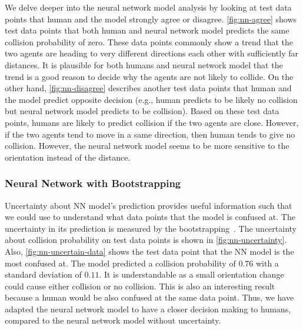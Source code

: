 We delve deeper into the neural network model analysis by looking at test data points that human and the model strongly agree or disagree.
\cref{fig:nn-agree} shows test data points that both human and neural network model predicts the same collision probability of zero. 
These data points commonly show a trend that the two agents are heading to very different directions each other with sufficiently far distances. 
It is plausible for both humans and neural network model that the trend is a good reason to decide why the agents are not likely to collide.
On the other hand, \cref{fig:nn-disagree} describes another test data points that human and the model predict opposite decision (e.g., human predicts to be likely no collision but neural network model predicts to be collision).
Based on these test data points, humans are likely to predict collision if the two agents are close. However, if the two agents tend to move in a same direction, then human tends to give no collision.
However, the neural network model seems to be more sensitive to the orientation instead of the distance.%
\\

\subsubsection{Neural Network with Bootstrapping}
Uncertainty about NN model's prediction provides useful information such that we could use to understand what data points that the model is confused at. 
The uncertainty in its prediction is measured by the bootstrapping~\cite{Osband2016, Lakshmi2016}. 
The uncertainty about collision probability on test data points is shown in \cref{fig:nn-uncertainty}. Also, \cref{fig:nn-uncertain-data} shows the test data point that the NN model is the most confused at.
The model predicted a collision probability of $0.76$ with a standard deviation of $0.11$. 
It is understandable as a small orientation change could cause either collision or no collision.
This is also an interesting result because a human would be also confused at the same data point. Thus, we have adapted the neural network model to have a closer decision making to humans, compared to the neural network model without uncertainty.

